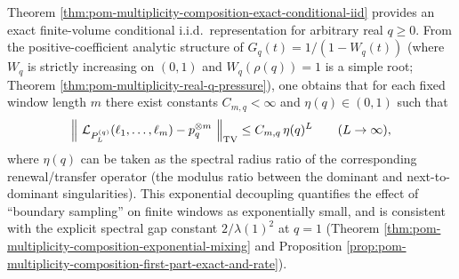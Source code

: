 

\begin{remark}[Finite-window tensorization and exponential decoupling for general \texorpdfstring{$q\ge 0$}{q>=0}]\label{rem:pom-multiplicity-composition-window-tensorization}
Theorem \ref{thm:pom-multiplicity-composition-exact-conditional-iid} provides an exact finite-volume conditional i.i.d.\ representation for arbitrary real \(q\ge 0\).
From the positive-coefficient analytic structure of \(G_q(t)=1/(1-W_q(t))\) (where \(W_q\) is strictly increasing on \((0,1)\) and \(W_q(\rho(q))=1\) is a simple root; Theorem \ref{thm:pom-multiplicity-real-q-pressure}),
one obtains that for each fixed window length \(m\) there exist constants \(C_{m,q}<\infty\) and \(\eta(q)\in(0,1)\) such that
\[
\Bigl\|\ \mathcal{L}_{P_L^{(q)}}(\ell_1,\dots,\ell_m)-p_q^{\otimes m}\ \Bigr\|_{\mathrm{TV}}
\le C_{m,q}\,\eta(q)^{L}
\qquad(L\to\infty),
\]
where \(\eta(q)\) can be taken as the spectral radius ratio of the corresponding renewal/transfer operator (the modulus ratio between the dominant and next-to-dominant singularities).
This exponential decoupling quantifies the effect of ``boundary sampling'' on finite windows as exponentially small, and is consistent with the explicit spectral gap constant \(2/\lambda(1)^2\) at \(q=1\) (Theorem \ref{thm:pom-multiplicity-composition-exponential-mixing} and Proposition \ref{prop:pom-multiplicity-composition-first-part-exact-and-rate}).
\end{remark}
\endinput


